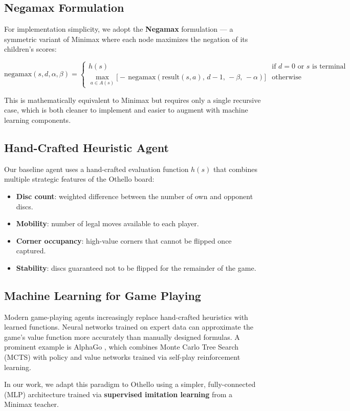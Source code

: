 \subsection{Negamax Formulation}

For implementation simplicity, we adopt the \textbf{Negamax} formulation — a symmetric variant of Minimax where each node maximizes the negation of its children's scores:

\begin{equation}
    \text{negamax}(s, d, \alpha, \beta) =
    \begin{cases}
        h(s) & \text{if } d = 0 \text{ or } s \text{ is terminal} \\
        \max_{a \in A(s)} \bigl[-\,\text{negamax}(\text{result}(s,a),\, d{-}1,\, -\beta,\, -\alpha)\bigr] & \text{otherwise}
    \end{cases}
\end{equation}

This is mathematically equivalent to Minimax but requires only a single recursive case, which is both cleaner to implement and easier to augment with machine learning components.

\subsection{Hand-Crafted Heuristic Agent}

Our baseline agent uses a hand-crafted evaluation function $h(s)$ that combines multiple strategic features of the Othello board:

\begin{itemize}
    \item \textbf{Disc count}: weighted difference between the number of own and opponent discs.
    \item \textbf{Mobility}: number of legal moves available to each player.
    \item \textbf{Corner occupancy}: high-value corners that cannot be flipped once captured.
    \item \textbf{Stability}: discs guaranteed not to be flipped for the remainder of the game.
\end{itemize}

\subsection{Machine Learning for Game Playing}

Modern game-playing agents increasingly replace hand-crafted heuristics with learned functions. Neural networks trained on expert data can approximate the game's value function more accurately than manually designed formulas. A prominent example is AlphaGo \cite{silver2016mastering}, which combines Monte Carlo Tree Search (MCTS) with policy and value networks trained via self-play reinforcement learning.

In our work, we adapt this paradigm to Othello using a simpler, fully-connected (MLP) architecture trained via \textbf{supervised imitation learning} from a Minimax teacher.
